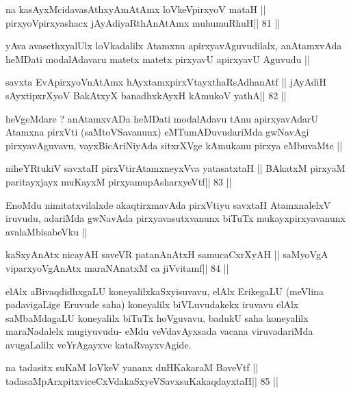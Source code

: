 \begin{shl}
na kasAyxMcidavasAthxyAmAtAmx loVkeV\s pirxyoV mataH ||
pirxyoV\s pirxyashacx jAyAdiyaRthA\s nAtAmx muhumuRhuH\hfill || 81 ||
\end{shl}

\begin{artha}
yAva avasethxyalUlx loVkadalilx Atamxnu apirxyavAguvudilalx,
anAtamxvAda heMDati modalAdavaru matetx matetx pirxyavU apirxyavU
Aguvudu ||
\end{artha}

\begin{shl}
savxta EvApirxyoV\s nAtAmx hAyxtamxpirxVtayxthaRsAdhanAtf ||
jAyAdiH sAyxtipxrXyoV BakAtxyX banadhxkAyxH kAmukoV yathA\hfill || 82 ||
\end{shl}

\begin{artha}
heVgeMdare ? anAtamxvADa heMDati modalAdavu tAnu apirxyavAdarU Atamxna
pirxVti (saMtoVSavanunx) eMTumADuvudariMda gwNavAgi pirxyavAguvavu,
vayxBicAriNiyAda sitxrXVge kAmukanu pirxya eMbuvaMte ||
\end{artha}

\begin{shl}
niheYRtukiV savxtaH pirxVtirAtamxneyxVva yatasatxtaH ||
BAkatxM pirxyaM paritayxjayx muKayxM pirxyamupAsharxyeVtf\hfill || 83 ||
\end{shl}

\begin{artha}
EnoMdu nimitatxvilalxde akaqtirxmavAda pirxVtiyu savxtaH AtamxnalelxV
iruvudu, adariMda gwNavAda pirxyavasutxvanunx biTuTx
mukayxpirxyavanunx avalaMbisabeVku ||
\end{artha}

\begin{shl}
kaSxyAnAtx nicayAH saveVR patanAnAtxH samucaCxrXyAH ||
saMyoVgA viparxyoVgAnAtx maraNAnatxM ca jiVvitamf\hfill || 84 ||
\end{shl}

\begin{artha}
elAlx aBivaqdidhxgaLU koneyalilxkaSxyisuvavu, elAlx ErikegaLU (meVlina
padavigaLige Eruvude saha) koneyalilx biVLuvudakekx iruvavu elAlx
saMbaMdagaLU koneyalilx biTuTx hoVguvavu, badukU saha koneyalilx
maraNadalelx mugiyuvudu- eMdu veVdavAyxsada vacana viruvadariMda
avugaLalilx veYrAgayxve kataRvayxvAgide.
\end{artha}

\begin{shl}
na tadasitx suKaM loVkeV yananx duHKakaraM BaveVtf ||
tadasaMpArxpitxviceCxVdakaSxyeVSavxsuKakaqdayxtaH\hfill || 85 ||
\end{shl}


